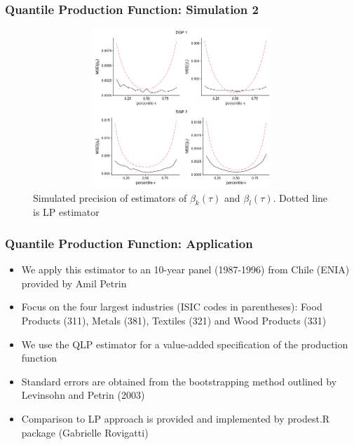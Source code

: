 \documentclass{beamer}
\begin{document}

\begin{frame}
\frametitle{Quantile Production Function: Simulation 2}
\begin{figure}[H]
\centering
\caption{Simulated precision of estimators of $\beta_{k}(\tau)$ and $\beta_{l}(\tau)$. Dotted line is LP estimator}
\includegraphics[width=12cm, height=6cm, keepaspectratio]{LP_MSE_Plot.png}
\end{figure}
\end{frame}



\begin{frame}
\frametitle{Quantile Production Function: Application}
\begin{itemize}
	\item We apply this estimator to an 10-year panel (1987-1996) from Chile (ENIA) provided by Amil Petrin 
	\item Focus on the four largest industries (ISIC codes in parentheses): Food Products (311), Metals (381), Textiles (321) and Wood Products (331)
	\item We use the QLP estimator for a value-added specification of the production function
	\item Standard errors are obtained from the bootstrapping method outlined by Levinsohn and Petrin (2003)
	\item Comparison to LP approach is provided and implemented by prodest.R package (Gabrielle Rovigatti)
\end{itemize}
\end{frame}

\end{document}
